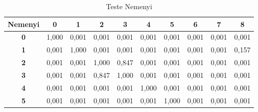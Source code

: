 \begin{table}[!htb]
	\centering
	\caption{Teste Nemenyi}\label{tb:nemeyi}
	\begin{tabular}{@{}clllllllll@{}}
		\toprule
		\multicolumn{1}{l}{\textbf{Nemenyi}} & \multicolumn{1}{c}{\textbf{0}} & \multicolumn{1}{c}{\textbf{1}} & \multicolumn{1}{c}{\textbf{2}} & \multicolumn{1}{c}{\textbf{3}} & \multicolumn{1}{c}{\textbf{4}} & \multicolumn{1}{c}{\textbf{5}} & \multicolumn{1}{c}{\textbf{6}} & \multicolumn{1}{c}{\textbf{7}} & \multicolumn{1}{c}{\textbf{8}} \\ \midrule
		\textbf{0}                           & 1,000                          & 0,001                          & 0,001                          & 0,001                          & 0,001                          & 0,001                          & 0,001                          & 0,001                          & 0,001                          \\
		\textbf{1}                           & 0,001                          & 1,000                          & 0,001                          & 0,001                          & 0,001                          & 0,001                          & 0,001                          & 0,001                          & 0,157                          \\
		\textbf{2}                           & 0,001                          & 0,001                          & 1,000                          & 0,847                          & 0,001                          & 0,001                          & 0,001                          & 0,001                          & 0,001                          \\
		\textbf{3}                           & 0,001                          & 0,001                          & 0,847                          & 1,000                          & 0,001                          & 0,001                          & 0,001                          & 0,001                          & 0,001                          \\
		\textbf{4}                           & 0,001                          & 0,001                          & 0,001                          & 0,001                          & 1,000                          & 0,001                          & 0,001                          & 0,001                          & 0,001                          \\
		\textbf{5}                           & 0,001                          & 0,001                          & 0,001                          & 0,001                          & 0,001                          & 1,000                          & 0,001                          & 0,001                          & 0,001                          \\

\end{tabular}
\end{table}
